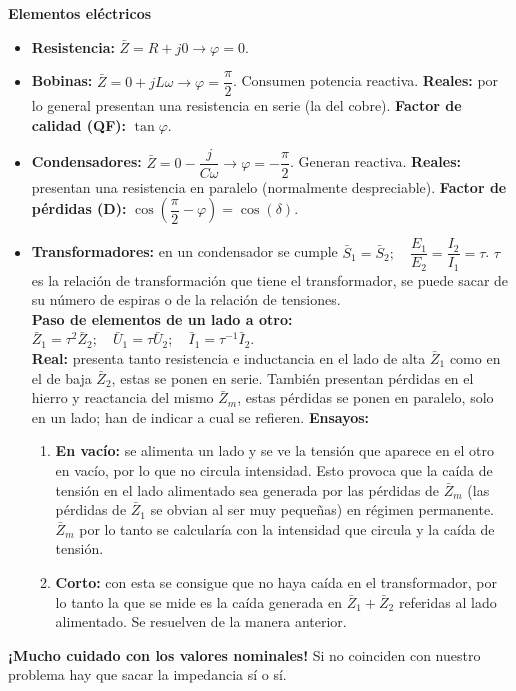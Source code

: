 \documentclass[a4paper, twocolumn, 10pt]{article}
\begin{document}
\Large\textbf{Elementos eléctricos} \normalsize

\begin{itemize}
	\item \textbf{Resistencia:} $\bar{Z} = R + j0 \rightarrow \varphi = 0$.
	\item \textbf{Bobinas:} $\bar{Z} = 0 + jL\omega \rightarrow \varphi = \dfrac{\pi}{2}$. Consumen potencia reactiva. \textbf{Reales:} por lo general presentan una resistencia en serie (la del cobre). \textbf{Factor de calidad (QF):} $\tan\varphi$.
	\item \textbf{Condensadores:} $\bar{Z} = 0 - \dfrac{j}{C\omega} \rightarrow \varphi = -\dfrac{\pi}{2}$. Generan reactiva. \textbf{Reales:} presentan una resistencia en paralelo (normalmente despreciable). \textbf{Factor de pérdidas (D):} $\cos\left(\dfrac{\pi}{2} - \varphi\right) = \cos(\delta)$.
	\item \textbf{Transformadores:} en un condensador se cumple $\bar{S}_1 = \bar{S}_2; \quad \dfrac{E_1}{E_2} = \dfrac{I_2}{I_1} = \tau$. $\tau$ es la relación de transformación que tiene el transformador, se puede sacar de su número de espiras o de la relación de tensiones. \\ \textbf{Paso de elementos de un lado a otro:} $\bar{Z}_1 = \tau^2\bar{Z}_2; \quad \bar{U}_1 = \tau\bar{U}_2; \quad \bar{I}_1 = \tau^{-1}\bar{I}_2$. \\
	\textbf{Real:} presenta tanto resistencia e inductancia en el lado de alta $\bar{Z}_1$ como en el de baja $\bar{Z}_2$, estas se ponen en serie. También presentan pérdidas en el hierro y reactancia del mismo $\bar{Z}_m$, estas pérdidas se ponen en paralelo, solo en un lado; han de indicar a cual se refieren. \textbf{Ensayos:}
	\begin{enumerate}
		\item \textbf{En vacío:} se alimenta un lado y se ve la tensión que aparece en el otro en vacío, por lo que no circula intensidad. Esto provoca que la caída de tensión en el lado alimentado sea generada por las pérdidas de $\bar{Z}_m$ (las pérdidas de $\bar{Z}_1$ se obvian al ser muy pequeñas) en régimen permanente. $\bar{Z}_m$ por lo tanto se calcularía con la intensidad que circula y la caída de tensión.
		\item \textbf{Corto:} con esta se consigue que no haya caída en el transformador, por lo tanto la que se mide es la caída generada en $\bar{Z}_1 + \bar{Z}_2$ referidas al lado alimentado. Se resuelven de la manera anterior.
	\end{enumerate}  
\end{itemize}
\textbf{¡Mucho cuidado con los valores nominales!} Si no coinciden con nuestro problema hay que sacar la impedancia sí o sí. \\
\end{document}
